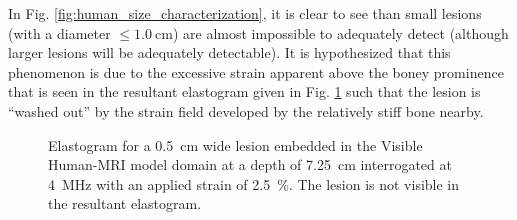 			In Fig. \ref{fig:human_size_characterization}, it is clear to see than small lesions (with a diameter $\leq \SI{1.0}{\cm}$) are almost impossible to adequately detect (although larger lesions will be adequately detectable). It is hypothesized that this phenomenon is due to the excessive strain apparent above the boney prominence that is seen in the resultant elastogram given in Fig. \ref{fig:human_elastogram} such that the lesion is ``washed out'' by the strain field developed by the relatively stiff bone nearby.

			\begin{figure}[!htb]
				\centering
				\caption[Sample elastogram of a Visible Human model lesion]{Elastogram for a \SI{0.5}{\cm} wide lesion embedded in the Visible Human-MRI model domain at a depth of \SI{7.25}{\cm} interrogated at \SI{4}{\MHz} with an applied strain of \SI{2.5}{\percent}. The lesion is not visible in the resultant elastogram.}
				\label{fig:human_elastogram}
			\end{figure}


